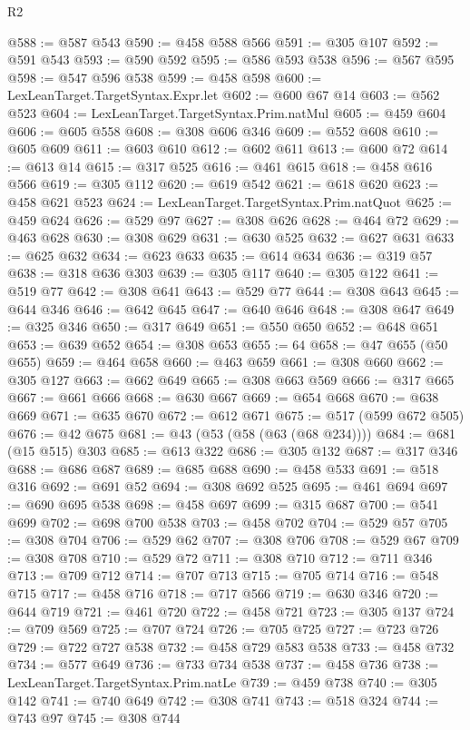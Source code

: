 \begin{lexlean}{R2}
\begin{coremodule}
@588 := @587 @543
@590 := @458 @588 @566
@591 := @305 @107
@592 := @591 @543
@593 := @590 @592
@595 := @586 @593 @538
@596 := @567 @595
@598 := @547 @596 @538
@599 := @458 @598
@600 := LexLeanTarget.TargetSyntax.Expr.let
@602 := @600 @67 @14
@603 := @562 @523
@604 := LexLeanTarget.TargetSyntax.Prim.natMul
@605 := @459 @604
@606 := @605 @558
@608 := @308 @606 @346
@609 := @552 @608
@610 := @605 @609
@611 := @603 @610
@612 := @602 @611
@613 := @600 @72
@614 := @613 @14
@615 := @317 @525
@616 := @461 @615
@618 := @458 @616 @566
@619 := @305 @112
@620 := @619 @542
@621 := @618 @620
@623 := @458 @621 @523
@624 := LexLeanTarget.TargetSyntax.Prim.natQuot
@625 := @459 @624
@626 := @529 @97
@627 := @308 @626
@628 := @464 @72
@629 := @463 @628
@630 := @308 @629
@631 := @630 @525
@632 := @627 @631
@633 := @625 @632
@634 := @623 @633
@635 := @614 @634
@636 := @319 @57
@638 := @318 @636 @303
@639 := @305 @117
@640 := @305 @122
@641 := @519 @77
@642 := @308 @641
@643 := @529 @77
@644 := @308 @643
@645 := @644 @346
@646 := @642 @645
@647 := @640 @646
@648 := @308 @647
@649 := @325 @346
@650 := @317 @649
@651 := @550 @650
@652 := @648 @651
@653 := @639 @652
@654 := @308 @653
@655 := 64
@658 := @47 @655 (@50 @655)
@659 := @464 @658
@660 := @463 @659
@661 := @308 @660
@662 := @305 @127
@663 := @662 @649
@665 := @308 @663 @569
@666 := @317 @665
@667 := @661 @666
@668 := @630 @667
@669 := @654 @668
@670 := @638 @669
@671 := @635 @670
@672 := @612 @671
@675 := @517 (@599 @672 @505)
@676 := @42 @675
@681 := @43 (@53 (@58 (@63 (@68 @234))))
@684 := @681 (@15 @515) @303
@685 := @613 @322
@686 := @305 @132
@687 := @317 @346
@688 := @686 @687
@689 := @685 @688
@690 := @458 @533
@691 := @518 @316
@692 := @691 @52
@694 := @308 @692 @525
@695 := @461 @694
@697 := @690 @695 @538
@698 := @458 @697
@699 := @315 @687
@700 := @541 @699
@702 := @698 @700 @538
@703 := @458 @702
@704 := @529 @57
@705 := @308 @704
@706 := @529 @62
@707 := @308 @706
@708 := @529 @67
@709 := @308 @708
@710 := @529 @72
@711 := @308 @710
@712 := @711 @346
@713 := @709 @712
@714 := @707 @713
@715 := @705 @714
@716 := @548 @715
@717 := @458 @716
@718 := @717 @566
@719 := @630 @346
@720 := @644 @719
@721 := @461 @720
@722 := @458 @721
@723 := @305 @137
@724 := @709 @569
@725 := @707 @724
@726 := @705 @725
@727 := @723 @726
@729 := @722 @727 @538
@732 := @458 @729 @583 @538
@733 := @458 @732
@734 := @577 @649
@736 := @733 @734 @538
@737 := @458 @736
@738 := LexLeanTarget.TargetSyntax.Prim.natLe
@739 := @459 @738
@740 := @305 @142
@741 := @740 @649
@742 := @308 @741
@743 := @518 @324
@744 := @743 @97
@745 := @308 @744

\end{coremodule}
\end{lexlean}
